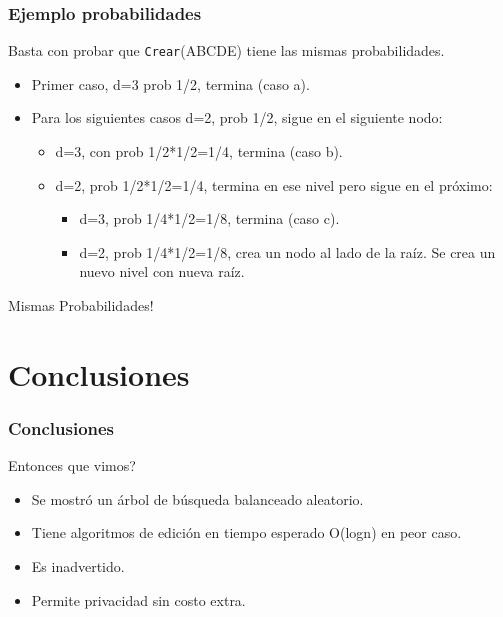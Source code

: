 \documentclass[10pt]{beamer}
\begin{document}
\begin{frame}
\frametitle{Ejemplo probabilidades}

Basta con probar que \texttt{Crear}(ABCDE) tiene las mismas probabilidades.

\begin{itemize}
  \item Primer caso, d=3 prob 1/2, termina (caso a). \pause
  \item Para los siguientes casos d=2, prob 1/2, sigue en el siguiente nodo:
\pause
    \begin{itemize}\pause
      \item d=3, con prob 1/2*1/2=1/4, termina (caso b).\pause
      \item d=2, prob 1/2*1/2=1/4, termina en ese nivel pero sigue en el próximo:
\pause
        \begin{itemize}\pause
          \item d=3, prob 1/4*1/2=1/8, termina (caso c).\pause
          \item d=2, prob 1/4*1/2=1/8, crea un nodo al lado de la raíz. Se crea
            un nuevo nivel con nueva raíz.
        \end{itemize}
    \end{itemize}
\end{itemize}

\pause
\begin{mdframed}[backgroundcolor=frenchblue!20]
  \centering
  Mismas Probabilidades!
\end{mdframed}
\end{frame}


\section{Conclusiones}
\begin{frame}
\frametitle{Conclusiones}
Entonces que vimos?
\pause
\begin{itemize}
  \item Se mostró un árbol de búsqueda balanceado aleatorio.
  \item Tiene algoritmos de edición en tiempo esperado O(logn) en peor caso.\pause
  \item Es inadvertido.
  \item Permite privacidad sin costo extra.
\end{itemize}

\end{frame}
\end{document}
